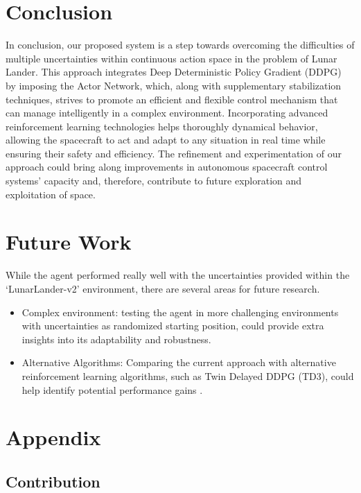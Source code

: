 \documentclass[conference]{IEEEtran}
\begin{document}
\section{Conclusion}
In conclusion, our proposed system is a step towards overcoming the difficulties of multiple uncertainties within continuous action space in the problem of Lunar Lander. This approach integrates Deep Deterministic Policy Gradient (DDPG) by imposing the Actor Network, which, along with supplementary stabilization techniques, strives to promote an efficient and flexible control mechanism that can manage intelligently in a complex environment. Incorporating advanced reinforcement learning technologies helps thoroughly  dynamical behavior, allowing the spacecraft to act and adapt to any situation in real time while ensuring their safety and efficiency. The refinement and experimentation of our approach could bring along improvements in autonomous spacecraft control systems' capacity and, therefore, contribute to future exploration and exploitation of space.

\section{Future Work}
While the agent performed really well with the uncertainties provided within the ‘LunarLander-v2’ environment, there are several areas for future research.
\begin{itemize}
\item Complex environment: testing the agent in more challenging environments with uncertainties as randomized starting position, could provide extra insights into its adaptability and robustness.

\item Alternative Algorithms: Comparing the current approach with alternative reinforcement learning algorithms, such as Twin Delayed DDPG (TD3), could help identify potential performance gains \cite{openaiTwinDelayed}.

\end{itemize}


\printbibliography %

\onecolumn
\section{Appendix}
\subsection{Contribution}
\end{document}
